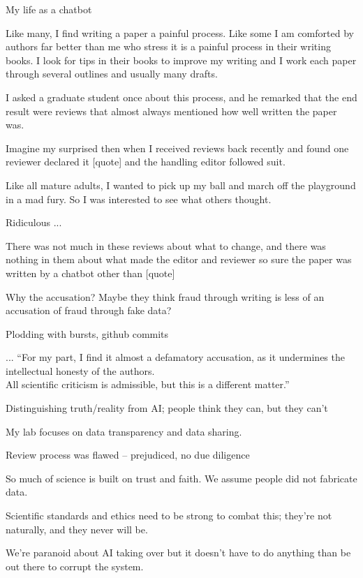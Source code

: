 \documentclass[11pt]{article}
\begin{document}

\renewcommand{\refname}{\CHead{}}


My life as a chatbot %

Like many, I find writing a paper a painful process. Like some I am comforted by authors far better than me who stress it is a painful process in their writing books. I look for tips in their books to improve my writing and I work each paper through several outlines and usually many drafts.  

I asked a graduate student once about this process, and he remarked that the end result were reviews that almost always mentioned how well written the paper was. 

Imagine my surprised then when I received reviews back recently and found one reviewer declared it [quote] and the handling editor followed suit. 

Like all mature adults, I wanted to pick up my ball and march off the playground in a mad fury. So I was interested to see what others thought.

Ridiculous ... 

There was not much in these reviews about what to change, and there was nothing in them about what made the editor and reviewer so sure the paper was written by a chatbot other than [quote]

Why the accusation? Maybe they think fraud through writing is less of an accusation of fraud through fake data? 

Plodding with bursts, github commits

... ``For my part, I find it almost a defamatory accusation, as it undermines the intellectual honesty of the authors.\\
All scientific criticism is admissible, but this is a different matter.''

Distinguishing truth/reality from AI; people think they can, but they can't

My lab focuses on data transparency and data sharing.

Review process was flawed -- prejudiced, no due diligence

So much of science is built on trust and faith. We assume people did not fabricate data.

Scientific standards and ethics need to be strong to combat this; they're not naturally, and they never will be.

We're paranoid about AI taking over but it doesn't have to do anything than be out there to corrupt the system. 
\end{document}
